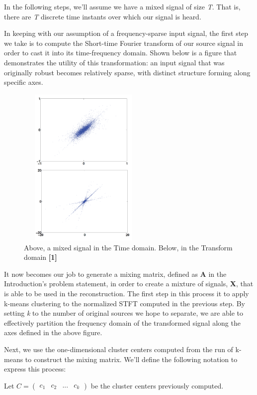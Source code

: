 \documentclass{article}
\begin{document}
In the following steps, we'll assume we have a mixed signal of size \textit{T}. That is, there are \textit{T} discrete time instants over which our signal is heard.

In keeping with our assumption of a frequency-sparse input signal, the first step we take is to compute the Short-time Fourier transform of our source signal in order to cast it into its time-frequency domain. Shown below is a figure that demonstrates the utility of this transformation: an input signal that was originally robust becomes relatively sparse, with distinct structure forming along specific axes.

\begin{figure}[H]
	\centering
	\includegraphics[width=180pt, height=220pt]{figs/transform_domain.png}
	\caption{Above, a mixed signal in the Time domain. Below, in the Transform domain \textbf{[1]}}
	\label{Signal in each Domain}
\end{figure}

It now becomes our job to generate a mixing matrix, defined as \textbf{A} in the Introduction's problem statement, in order to create a mixture of signals, \textbf{X}, that is able to be used in the reconstruction. The first step in this process it to apply k-means clustering to the normalized STFT computed in the previous step. By setting \textit{k} to the number of original sources we hope to separate, we are able to effectively partition the frequency domain of the transformed signal along the axes defined in the above figure.

Next, we use the one-dimensional cluster centers computed from the run of k-means to construct the mixing matrix. We'll define the following notation to express this process:

Let $C = \left( \begin{smallmatrix} c_{1}&c_{2}&...&c_{\textit{k}} \end{smallmatrix} \right)$ be the cluster centers previously computed. 
\end{document}
